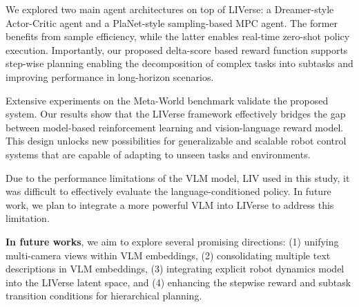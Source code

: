 \documentclass[11pt]{article}
\begin{document}
We explored two main agent architectures on top of LIVerse: a Dreamer-style Actor-Critic agent and a PlaNet-style sampling-based MPC agent. The former benefits from sample efficiency, while the latter enables real-time zero-shot policy execution. Importantly, our proposed delta-score based reward function supports step-wise planning enabling the decomposition of complex tasks into subtasks and improving performance in long-horizon scenarios.

Extensive experiments on the Meta-World benchmark validate the proposed system. Our results show that the LIVerse framework effectively bridges the gap between model-based reinforcement learning and vision-language reward model. This design unlocks new possibilities for generalizable and scalable robot control systems that are capable of adapting to unseen tasks and environments. 

Due to the performance limitations of the VLM model, LIV used in this study, it was difficult to effectively evaluate the language-conditioned policy. In future work, we plan to integrate a more powerful VLM into LIVerse to address this limitation. 

\textbf{In future works}, we aim to explore several promising directions: (1) unifying multi-camera views within VLM embeddings, (2) consolidating multiple text descriptions in VLM embeddings, (3) integrating explicit robot dynamics model into the LIVerse latent space, and (4) enhancing the stepwise reward and subtask transition conditions for hierarchical planning.
\end{document}
